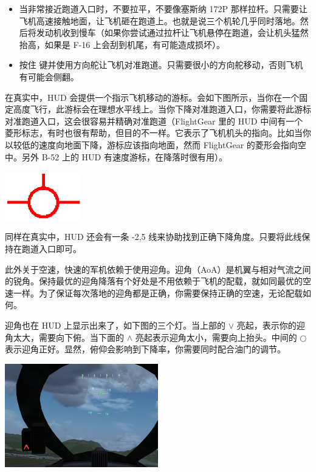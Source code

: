 \begin{itemize}
\begin{itemize}
\item 当非常接近跑道入口时，不要拉平，不要像塞斯纳 172P 那样拉杆。只需要让飞机高速接触地面，让飞机砸在跑道上。也就是说三个机轮几乎同时落地。然后将发动机收到慢车（如果你尝试通过拉杆让飞机悬停在跑道，会让机头猛然抬高，如果是 F-16 上会刮到机尾，有可能造成损坏）。

\item 按住  键并使用方向舵让飞机对准跑道。只需要很小的方向舵移动，否则飞机有可能会侧翻。
\end{itemize}

在真实中，HUD 会提供一个指示飞机移动的游标。会如下图所示，当你在一个固定高度飞行，此游标会在理想水平线上。当你下降对准跑道入口，你需要将此游标对准跑道入口，这会很容易并精确对准跑道（FlightGear 里的 HUD 中间有一个菱形标志，有时也很有帮助，但目的不一样。它表示了飞机机头的指向。比如当你以较低的速度向地面下降，游标应该指向地面，然而 FlightGear 的菱形会指向空中。另外 B-52 上的 HUD 有速度游标，在降落时很有用）。

\begin{center}
	\includegraphics[width=0.25\textwidth]{img/basic_tutorial/aim-point}
\end{center}

同样在真实中，HUD 还会有一条 -2,5\textdegree{} 线来协助找到正确下降角度。只要将此线保持在跑道入口即可。

此外关于空速，快速的军机依赖于使用迎角。迎角（AoA）是机翼与相对气流之间的锐角。保持最优的迎角降落有个好处是不用依赖于飞机的配载，就如同最优的空速一样。为了保证每次落地的迎角都是正确，你需要保持正确的空速，无论配载如何。

迎角也在 HUD 上显示出来了，如下图的三个灯。当上部的 $\vee$ 亮起，表示你的迎角太大，需要向下俯。当下面的  $\wedge$ 亮起表示迎角太小，需要向上抬头。中间的 $\bigcirc$ 表示迎角正好。显然，俯仰会影响到下降率，你需要同时配合油门的调节。

\centerline{
  \includegraphics[width=0.5\textwidth]{img/basic_tutorial/f-14b-hud}
}


\end{itemize}
